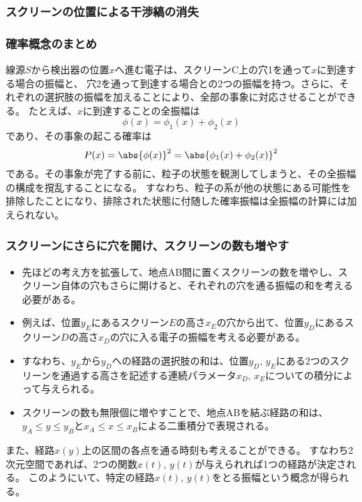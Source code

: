 \documentclass[11pt,aspectratio=169,xcolor=dvipsnames,table,dvipdfmx]{beamer}
\begin{document}
\begin{frame}
  \frametitle{スクリーンの位置による干渉縞の消失}
\begin{center}
\end{center}
\end{frame}

\begin{frame}
  \frametitle{確率概念のまとめ}
  線源$S$から検出器の位置$x$へ進む電子は、スクリーンC上の穴1を通って$x$に到達する場合の振幅と、
  穴2を通って到達する場合との2つの振幅を持つ。さらに、それぞれの選択肢の振幅を加えることにより、全部の事象に対応させることができる。
  たとえば、$x$に到達することの全振幅は
  \begin{equation}
    \phi(x) = \phi_1(x) + \phi_2(x)
  \end{equation}
  であり、その事象の起こる確率は
  \begin{equation}
    P(x) = \abs{\phi(x)}^2 = \abs{\phi_1(x)+\phi_2(x)}^2
  \end{equation}
  である。その事象が完了する前に、粒子の状態を観測してしまうと、その全振幅の構成を撹乱することになる。
  すなわち、粒子の系が他の状態にある可能性を排除したことになり、排除された状態に付随した確率振幅は全振幅の計算には加えられない。
\end{frame}
\begin{frame}
  \frametitle{スクリーンにさらに穴を開け、スクリーンの数も増やす}
  \begin{itemize}
    \item 先ほどの考え方を拡張して、地点AB間に置くスクリーンの数を増やし、スクリーン自体の穴もさらに開けると、それぞれの穴を通る振幅の和を考える必要がある。
    \item 例えば、位置$y_E$にあるスクリーン$E$の高さ$x_E$の穴から出て、位置$y_D$にあるスクリーン$D$の高さ$x_D$の穴に入る電子の振幅を考える必要がある。
    \item すなわち、$y_E$から$y_D$への経路の選択肢の和は、位置$y_D,\,y_E$にある2つのスクリーンを通過する高さを記述する連続パラメータ$x_D,\,x_E$についての積分によって与えられる。
    \item スクリーンの数も無限個に増やすことで、地点ABを結ぶ経路の和は、$y_A\leq y\leq y_B$と$x_A\leq x\leq x_B$による二重積分で表現される。
  \end{itemize}
  また、経路$x(y)$上の区間の各点を通る時刻も考えることができる。
  すなわち2次元空間であれば、2つの関数$x(t),\,y(t)$が与えられれば1つの経路が決定される。
  このようにいて、特定の経路$x(t),\,y(t)$をとる振幅という概念が得られる。
\end{frame}

\end{document}
